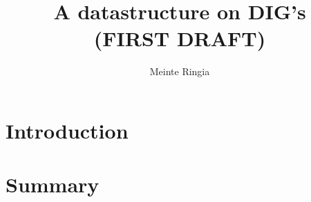 \documentclass[english]{Backend/uvamath}
\begin{document}
\title{A datastructure on DIG's\\ (FIRST DRAFT)}
\author[meinte.jr@gmail.com]{Meinte Ringia}
\secondgrader{}

\maketitle
\begin{abstract}
    
\end{abstract}

\tableofcontents
\afterpage{\null\newpage}

\chapter*{Introduction}
    

\afterpage{\null\newpage}
 

\chapter*{Summary}
    
\pagebreak


\printbibliography
\end{document}
